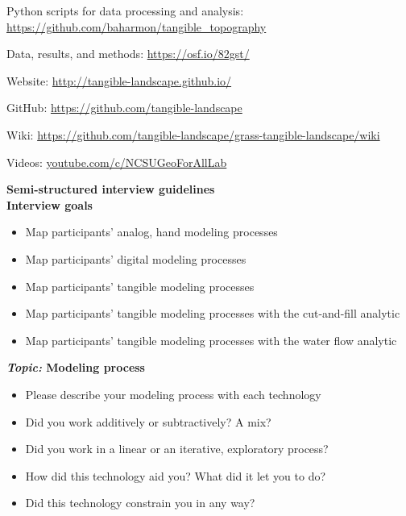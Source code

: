 \documentclass[Afour,sagev,times]{sagej} %
\begin{document}
\begin{sm}
%
\noindent
Python scripts for data processing and analysis: \\
\noindent
\url{https://github.com/baharmon/tangible_topography}

\noindent
Data, results, and methods: \url{https://osf.io/82gst/}

\noindent
Website: \url{http://tangible-landscape.github.io/}

\noindent
GitHub: \url{https://github.com/tangible-landscape}

\noindent
Wiki: \url{https://github.com/tangible-landscape/grass-tangible-landscape/wiki}

\noindent
Videos: \url{youtube.com/c/NCSUGeoForAllLab}


\vspace*{1em}
%
\noindent \textbf{Semi-structured interview guidelines}\label{appendix:guidelines} \\

\textbf{Interview goals}
\begin{itemize}
\item Map participants' analog, hand modeling processes
\item Map participants' digital modeling processes
\item Map participants' tangible modeling processes
\item Map participants' tangible modeling processes with the cut-and-fill analytic
\item Map participants' tangible modeling processes with the water flow analytic
\end{itemize}

\textbf{\emph{Topic:} Modeling process}
\begin{itemize}
\item Please describe your modeling process with each technology
\item Did you work additively or subtractively? A mix?
\item Did you work in a linear or an iterative, exploratory process?
\item How did this technology aid you? What did it let you to do?
\item Did this technology constrain you in any way?
\end{itemize}


\end{sm}
\end{document}
